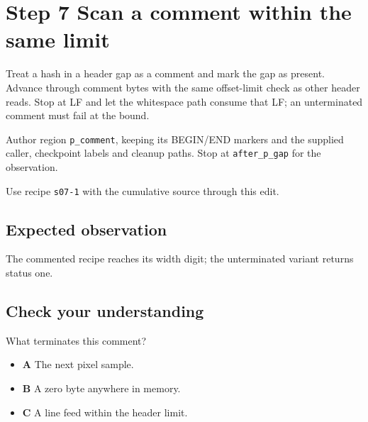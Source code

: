 \section{Step 7 Scan a comment within the same limit}\label{ppm-s07}

Treat a hash in a header gap as a comment and mark the gap as present. Advance through comment bytes with the same offset-limit check as other header reads. Stop at LF and let the whitespace path consume that LF; an unterminated comment must fail at the bound.

Author region \texttt{p\_comment}, keeping its BEGIN/END markers and the supplied caller, checkpoint labels and cleanup paths. Stop at \texttt{after\_p\_gap} for the observation.

Use recipe \texttt{s07-1} with the cumulative source through this edit.

\subsection{Expected observation}
The commented recipe reaches its width digit; the unterminated variant returns status one.

\subsection{Check your understanding}
What terminates this comment?

\begin{itemize}
  \item \textbf{A} The next pixel sample.
  \item \textbf{B} A zero byte anywhere in memory.
  \item \textbf{C} A line feed within the header limit.
\end{itemize}
